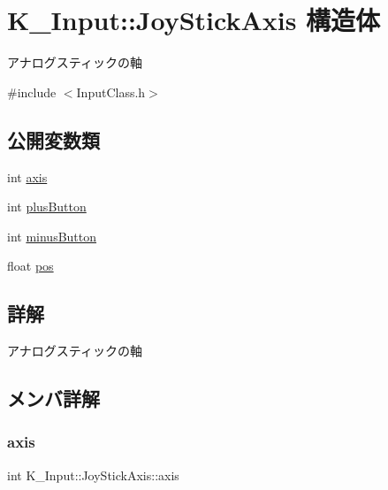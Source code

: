 \hypertarget{struct_k___input_1_1_joy_stick_axis}{}\section{K\+\_\+\+Input\+:\+:Joy\+Stick\+Axis 構造体}
\label{struct_k___input_1_1_joy_stick_axis}


アナログスティックの軸  




{\ttfamily \#include $<$Input\+Class.\+h$>$}

\subsection*{公開変数類}
\begin{DoxyCompactItemize}
\item 
int \mbox{\hyperlink{struct_k___input_1_1_joy_stick_axis_aafa1b716934d276c7a8ac1b857effcc2}{axis}}
\item 
int \mbox{\hyperlink{struct_k___input_1_1_joy_stick_axis_a315ea1fce7d6b0f3375439223eb82c70}{plus\+Button}}
\item 
int \mbox{\hyperlink{struct_k___input_1_1_joy_stick_axis_a2af0190f45d6b917d4e998b47ef04ca2}{minus\+Button}}
\item 
float \mbox{\hyperlink{struct_k___input_1_1_joy_stick_axis_a78e805db243c194f84baf5cb776e1275}{pos}}
\end{DoxyCompactItemize}


\subsection{詳解}
アナログスティックの軸 

\subsection{メンバ詳解}
\mbox{\label{struct_k___input_1_1_joy_stick_axis_aafa1b716934d276c7a8ac1b857effcc2}} 
\subsubsection{\texorpdfstring{axis}{axis}}
{\footnotesize\ttfamily int K\+\_\+\+Input\+::\+Joy\+Stick\+Axis\+::axis}

